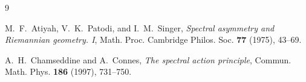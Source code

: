 \begin{thebibliography}{9}

M.~F.~Atiyah, V.~K.~Patodi, and I.~M.~Singer,
\newblock \emph{Spectral asymmetry and Riemannian geometry. I},
\newblock Math. Proc. Cambridge Philos. Soc. \textbf{77} (1975), 43--69.

A.~H.~Chamseddine and A.~Connes,
\newblock \emph{The spectral action principle},
\newblock Commun. Math. Phys. \textbf{186} (1997), 731--750.

\end{thebibliography}
